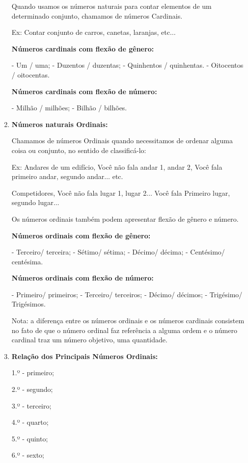 \begin{multicols*}{2}
\begin{enumerate}
			Quando usamos os números naturais para contar elementos de um determinado conjunto, chamamos de números Cardinais.
			
			Ex:  Contar conjunto de carros, canetas, laranjas, etc$\dots$
			
			\textbf{Números cardinais com flexão de gênero:}

			- Um / uma;
			- Duzentos / duzentas;
			- Quinhentos / quinhentas.
			- Oitocentos / oitocentas.

			\textbf{Números cardinais com flexão de número:}

			- Milhão / milhões;
			- Bilhão / bilhões.
			
			\item \textbf{Números naturais Ordinais:}
			
			Chamamos de números Ordinais quando necessitamos de ordenar alguma coisa ou conjunto, no sentido de classificá-lo:
			
			Ex: 	Andares de um edifício, Você não fala andar 1, andar 2, Você fala primeiro andar, segundo andar$\dots$ etc.
			
					Competidores, Você não fala lugar 1, lugar 2$\dots$ Você fala Primeiro lugar, segundo lugar$\dots$
					
					Os números ordinais também podem apresentar flexão de gênero e número.

					\textbf{Números ordinais com flexão de gênero:}

					- Terceiro/ terceira;
					- Sétimo/ sétima;
					- Décimo/ décima;
					- Centésimo/ centésima.

					\textbf{Números ordinais com flexão de número:}

					- Primeiro/ primeiros;
					- Terceiro/ terceiros;
					- Décimo/ décimos;
					- Trigésimo/ Trigésimos.

Nota: a diferença entre os números ordinais e os números cardinais consistem no fato de que o número ordinal faz referência a alguma ordem e o número cardinal traz um número objetivo, uma quantidade.

			\item \textbf{Relação dos Principais Números Ordinais:}
			
1.º - primeiro;

2.º - segundo;

3.º - terceiro;

4.º - quarto;

5.º - quinto;

6.º - sexto;


\end{enumerate}
\end{multicols*}
